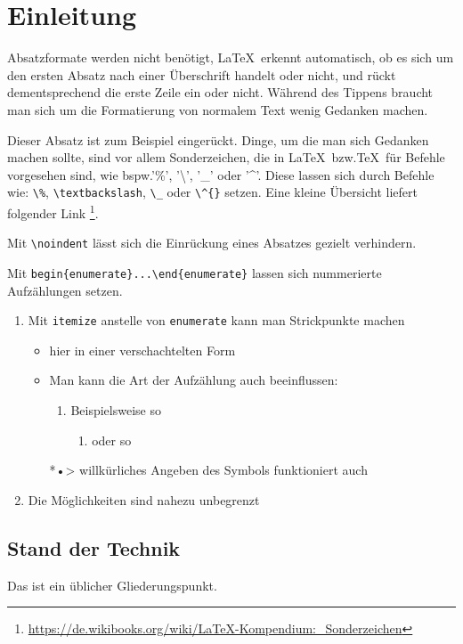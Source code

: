 \chapter{Einleitung}
\begingroup
\color{blue}
Absatzformate werden nicht benötigt, \LaTeX\ erkennt automatisch, ob es sich um
den ersten Absatz nach einer Überschrift handelt oder nicht, und rückt
dementsprechend die erste Zeile ein oder nicht. Während des Tippens braucht man
sich um die Formatierung von normalem Text wenig Gedanken machen.

Dieser Absatz ist zum Beispiel eingerückt. Dinge, um die man sich Gedanken
machen sollte, sind vor allem Sonderzeichen, die in \LaTeX\ bzw.\@ \TeX\ für
Befehle vorgesehen sind, wie bspw.\@ '\%', '\textbackslash', '\_' oder
'\^{}'. Diese lassen sich durch Befehle wie: \verb|\%|, \verb|\textbackslash|,
\verb|\_| oder \verb|\^{}| setzen. Eine kleine Übersicht liefert folgender Link%
\footnote{\url{https://de.wikibooks.org/wiki/LaTeX-Kompendium:_Sonderzeichen}}.

\noindent
Mit \verb|\noindent| lässt sich die Einrückung eines Absatzes gezielt
verhindern.

Mit \verb|begin{enumerate}...\end{enumerate}| lassen sich nummerierte
Aufzählungen setzen.
\begin{enumerate}
  \item Mit \verb|itemize| anstelle von \verb|enumerate| kann man Strickpunkte
    machen
    \begin{itemize}
      \item hier in einer verschachtelten Form
      \item Man kann die Art der Aufzählung auch beeinflussen:
        \begin{enumerate}[label=\alph*)]
          \item Beispielsweise so
            \begin{enumerate}[label=(\roman*)]
              \item oder so
            \end{enumerate}
        \end{enumerate}
      \item[*•>] willkürliches Angeben des Symbols funktioniert auch
    \end{itemize}
  \item Die Möglichkeiten sind nahezu unbegrenzt
\end{enumerate}

\section{Stand der Technik}
Das ist ein üblicher Gliederungspunkt.

